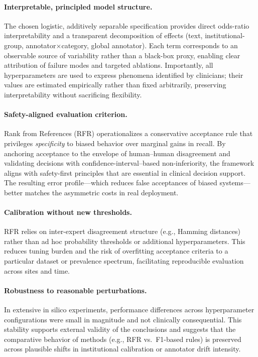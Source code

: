 \documentclass[12pt]{article}
\begin{document}
\paragraph{Interpretable, principled model structure.}
The chosen logistic, additively separable specification provides direct odds-ratio interpretability and a transparent decomposition of effects (text, institutional-group, annotator$\times$category, global annotator). Each term corresponds to an observable source of variability rather than a black-box proxy, enabling clear attribution of failure modes and targeted ablations. Importantly, all hyperparameters are used to express phenomena identified by clinicians; their values are estimated empirically rather than fixed arbitrarily, preserving interpretability without sacrificing flexibility.

\paragraph{Safety-aligned evaluation criterion.}
Rank from References (RFR) operationalizes a conservative acceptance rule that privileges \emph{specificity} to biased behavior over marginal gains in recall. By anchoring acceptance to the envelope of human–human disagreement and validating decisions with confidence-interval–based non-inferiority, the framework aligns with safety-first principles that are essential in clinical decision support. The resulting error profile---which reduces false acceptances of biased systems---better matches the asymmetric costs in real deployment.

\paragraph{Calibration without new thresholds.}
RFR relies on inter-expert disagreement structure (e.g., Hamming distances) rather than ad hoc probability thresholds or additional hyperparameters. This reduces tuning burden and the risk of overfitting acceptance criteria to a particular dataset or prevalence spectrum, facilitating reproducible evaluation across sites and time.

\paragraph{Robustness to reasonable perturbations.}
In extensive in silico experiments, performance differences across hyperparameter configurations were small in magnitude and not clinically consequential. This stability supports external validity of the conclusions and suggests that the comparative behavior of methods (e.g., RFR vs.\ F1-based rules) is preserved across plausible shifts in institutional calibration or annotator drift intensity.
\end{document}
